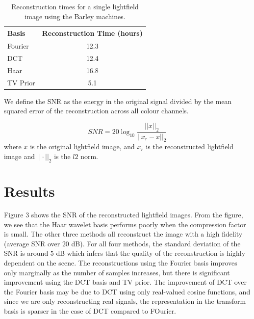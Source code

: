 \documentclass[10pt,twocolumn,letterpaper]{article}
\begin{document}
\begin{table}
  \begin{center}
  \begin{tabular}{|l|c|}
  \hline
  Basis & Reconstruction Time (hours)\\
  \hline\hline
  Fourier & 12.3 \\
  DCT & 12.4 \\
  Haar & 16.8\\
  TV Prior & 5.1\\ 
  \hline
  \end{tabular}
  \end{center}
  \caption{Reconstruction times for a single lightfield image using the Barley machines.}
\end{table}


We define the SNR as the energy in the original signal divided by the mean squared error of the reconstruction across all colour channels. 

\[SNR = 20 \log_{10}{\frac{||x||_2}{||x_r - x||_2}}\] where $x$ is the original lightfield image, and $x_r$ is the reconstructed lightfield image and $|| \cdot ||_2$ is the $l2$ norm.

\section{Results}

Figure 3 shows the SNR of the reconstructed lightfield images.  From the figure, we see that the Haar wavelet basis performs poorly when the compression factor is small. The other three methods all reconstruct the image with a high fidelity (average SNR over $20$ dB). For all four methods, the standard deviation of the SNR is around $5$ dB which infers that the quality of the reconstruction is highly dependent on the scene. The reconstructions using the Fourier basis improves only marginally as the number of samples increases, but there is significant improvement using the DCT basis and TV prior. The improvement of DCT over the Fourier basis may be due to DCT using only real-valued cosine functions, and since we are only reconstructing real signals, the representation in the transform basis is sparser in the case of DCT compared to FOurier.
\end{document}
